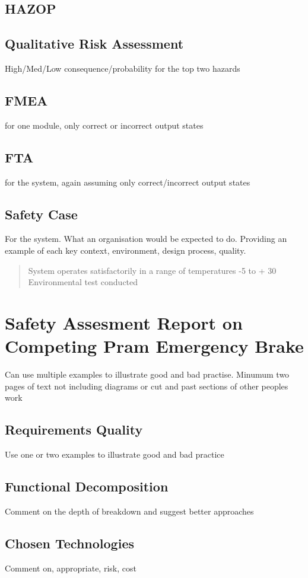 \documentclass[12pt,a4paper]{article}
\begin{document}
\subsection{HAZOP}
\subsection{Qualitative Risk Assessment}
High/Med/Low consequence/probability for the top two hazards
\subsection{FMEA}
for one module, only correct or incorrect output states
\subsection{FTA}
for the system, again assuming only correct/incorrect output states
\subsection{Safety Case}
For the system. What an organisation would be expected to do. Providing an example of each key context, environment, design process, quality.
\begin{quote}
System operates satisfactorily in a range of temperatures -5 to + 30 Environmental test conducted
\end{quote}


\section[Task Two]{Safety Assesment Report on Competing Pram Emergency Brake}\medskip
Can use multiple examples to illustrate good and bad practise. Minumum two pages of text not including diagrams
or cut and past sections of other peoples work
\subsection{Requirements Quality}
Use one or two examples to illustrate good and bad practice
\subsection{Functional Decomposition}
Comment on the depth of breakdown and suggest better approaches
\subsection{Chosen Technologies}
Comment on, appropriate, risk, cost
\end{document}
